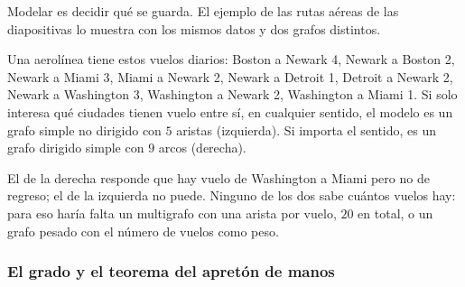 \documentclass[11pt,letterpaper]{article}
\begin{document}
Modelar es decidir qué se guarda. El ejemplo de las rutas aéreas de
las diapositivas lo muestra con los mismos datos y dos grafos
distintos.

\begin{ejemplo}
  Una aerolínea tiene estos vuelos diarios: Boston a Newark 4, Newark a
  Boston 2, Newark a Miami 3, Miami a Newark 2, Newark a Detroit 1,
  Detroit a Newark 2, Newark a Washington 3, Washington a Newark 2,
  Washington a Miami 1. Si solo interesa qué ciudades tienen vuelo
  entre sí, en cualquier sentido, el modelo es un grafo simple no
  dirigido con $5$ aristas (izquierda). Si importa el sentido, es un
  grafo dirigido simple con $9$ arcos (derecha).
  \begin{center}
  \end{center}
  El de la derecha responde que hay vuelo de Washington a Miami pero no
  de regreso; el de la izquierda no puede. Ninguno de los dos sabe
  cuántos vuelos hay: para eso haría falta un multigrafo con una arista
  por vuelo, $20$ en total, o un grafo pesado con el número de vuelos
  como peso.
\end{ejemplo}

\subsubsection*{El grado y el teorema del apretón de manos}
\end{document}
